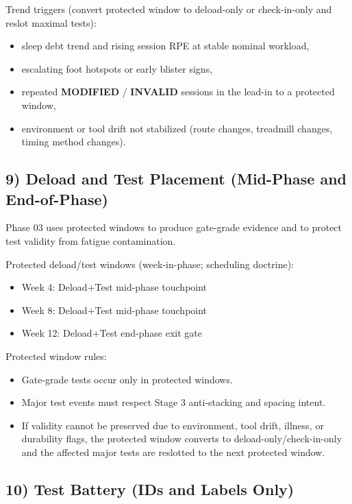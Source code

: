 \documentclass[10pt]{article}
\begin{document}
Trend triggers (convert protected window to deload-only or check-in-only and reslot maximal tests):

\begin{itemize}
\item sleep debt trend and rising session RPE at stable nominal workload,
\item escalating foot hotspots or early blister signs,
\item repeated \textbf{MODIFIED} / \textbf{INVALID} sessions in the lead-in to a protected window,
\item environment or tool drift not stabilized (route changes, treadmill changes, timing method changes).
\end{itemize}

\subsection*{9) Deload and Test Placement (Mid-Phase and End-of-Phase)}

Phase 03 uses protected windows to produce gate-grade evidence and to protect test validity from fatigue contamination.

Protected deload/test windows (week-in-phase; scheduling doctrine):

\begin{itemize}
\item Week 4: Deload+Test mid-phase touchpoint
\item Week 8: Deload+Test mid-phase touchpoint
\item Week 12: Deload+Test end-phase exit gate
\end{itemize}

Protected window rules:

\begin{itemize}
\item Gate-grade tests occur only in protected windows.
\item Major test events must respect Stage 3 anti-stacking and spacing intent.
\item If validity cannot be preserved due to environment, tool drift, illness, or durability flags, the protected window converts to deload-only/check-in-only and the affected major tests are reslotted to the next protected window.
\end{itemize}

\subsection*{10) Test Battery (IDs and Labels Only)}
\end{document}
